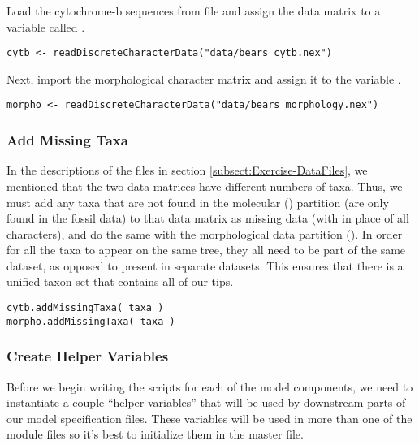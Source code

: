 Load the cytochrome-b sequences from file and assign the data matrix to a variable called .
{\tt \begin{snugshade*}
\begin{lstlisting}
cytb <- readDiscreteCharacterData("data/bears_cytb.nex") 
\end{lstlisting}
\end{snugshade*}}

Next, import the morphological character matrix and assign it to the variable . 
{\tt \begin{snugshade*}
\begin{lstlisting}
morpho <- readDiscreteCharacterData("data/bears_morphology.nex")
\end{lstlisting}
\end{snugshade*}}

 

\medskip
\subsubsection{Add Missing Taxa}\label{subsub:Exercise-AddMissing}

In the descriptions of the files in section \ref{subsect:Exercise-DataFiles}, we mentioned that the two data matrices have different numbers of taxa. 
Thus, we must add any taxa that are not found in the molecular () partition (\IE are only found in the fossil data) to that data matrix as missing data (with  in place of all characters), and do the same with the morphological data partition ().
In order for all the taxa to appear on the same tree, they all need to be part of the same dataset, as opposed to present in separate datasets. 
This ensures that there is a unified taxon set that contains all of our tips.
{\tt \begin{snugshade*}
\begin{lstlisting}
cytb.addMissingTaxa( taxa )
morpho.addMissingTaxa( taxa )
\end{lstlisting}
\end{snugshade*}}


\medskip
\subsubsection{Create Helper Variables}\label{subsub:Exercise-mviVar}

Before we begin writing the \Rev scripts for each of the model components, we need to instantiate a couple ``helper variables'' that will be used by downstream parts of our model specification files. 
These variables will be used in more than one of the module files so it's best to initialize them in the master file.

